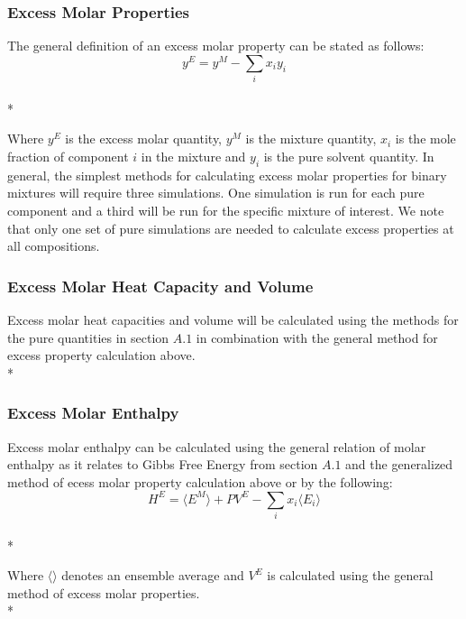 \documentclass[aps,pre,twocolumn,nofootinbib,superscriptaddress,linenumbers,10pt, draft,tightenlines]{revtex4-1}
\begin{document}
\subsubsection{Excess Molar Properties}
The general definition of an excess molar property can be stated as follows:
\begin{equation}y^{E} = y^{M} - \sum_{i} x_i y_i\end{equation}\\*

Where $y^E$ is the excess molar quantity, $y^M$ is the mixture quantity, $x_i$ is the mole fraction of component $i$ in the mixture and $y_i$ is the pure solvent quantity. In general, the simplest methods for calculating excess molar properties for binary mixtures will require three simulations. One simulation is run for each pure component and a third will be run for the specific mixture of interest.
We note that only one set of pure simulations are needed to calculate excess properties at all compositions.

\subsubsection{Excess Molar Heat Capacity and Volume}
Excess molar heat capacities and volume will be calculated using the  methods for the pure quantities in section $A.1$ in combination with the general method for excess property calculation above.\\*

\subsubsection{Excess Molar Enthalpy}
Excess molar enthalpy can be calculated using the general relation of molar enthalpy as it relates to Gibbs Free Energy from section $A.1$ and the generalized method of ecess molar property calculation above or by the following\cite{hexcess}:
\begin{equation}H^E = \langle E^M \rangle + P V^E - \sum_{i} x_i \langle E_i \rangle\end{equation}\\*

 Where $\langle \rangle$ denotes an ensemble average and $V^E$ is calculated using the general method of excess molar properties.\\* 


 

\end{document}
